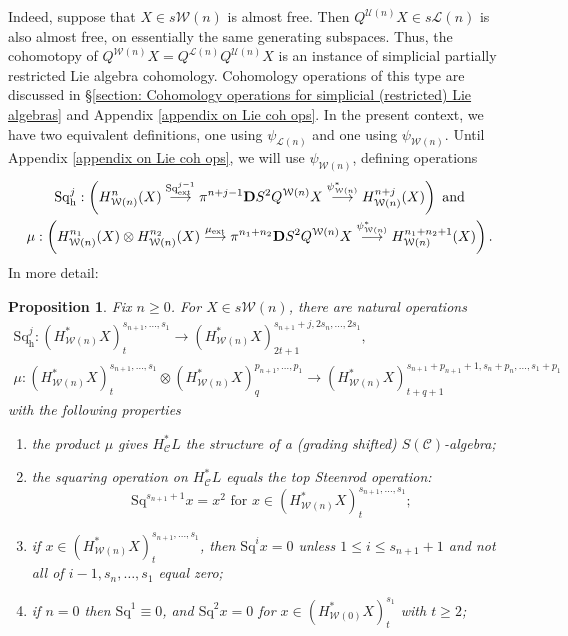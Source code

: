 \documentclass[11pt]{amsart} \renewcommand{\baselinestretch}{1.2}
\theoremstyle{plain}
\newtheorem{prop}[thm]{Proposition}
\numberwithin{equation}{section} %
\theoremstyle{plain}
\newtheorem{prop}[thm]{Proposition}
\numberwithin{equation}{chapter} %
\renewcommand{\to}{\longrightarrow}
\newcommand{\scrC}{\mathscr{C}}
\newcommand{\calU}{\mathcal{U}}
\newcommand{\calL}{\mathcal{L}}
\newcommand{\calw}{\mathcal{W}}
\newcommand{\calc}{\mathcal{C}}
\newcommand{\CommOperad}{{\scrC}}
\newcommand{\ExtCohOp}{\mathrm{Sq}_\mathrm{ext}}
\newcommand{\ExtCohProd}{\mu_\mathrm{ext}}
\newcommand{\Sq}{\mathrm{Sq}}
\newcommand{\dhor}{_\mathrm{h}}
\newcommand{\Sqh}{\mathrm{Sq}\dhor}
\newcommand{\dual}{\mathbf{D}}
\begin{document}
\begin{Cohomology Operations for W and U}
Indeed, suppose that $X\in s\calw(n)$ is almost free. Then $Q^{\calU(n)}X\in s\calL(n)$ is also almost free, on essentially the same generating subspaces. Thus, the cohomotopy of $Q^{\calw(n)}X=Q^{\calL(n)}Q^{\calU(n)}X$ is an instance of simplicial partially restricted Lie algebra cohomology. Cohomology operations of this type are discussed in \S\ref{section: Cohomology operations for simplicial (restricted) Lie algebras} and Appendix \ref{appendix on Lie coh ops}. In the present context, we have two equivalent definitions, one using $\psi_{\calL(n)}$ and one using $\psi_{\calw(n)}$. Until Appendix \ref{appendix on Lie coh ops}, we will use $\psi_{\calw(n)}$, defining operations
\begin{gather*}
\Sqh^j:\left(H_{\calw(n)}^{n}(X)\overset{\ExtCohOp^{j-1}}{\to} \pi^{n+j-1}\dual S^2Q^{\calw(n)}X\overset{\psi_{\calw(n)}^*}{\to} H_{\calw(n)}^{n+j}(X)\right)\textup{ and}\\
\mu:\left(H_{\calw(n)}^{n_1}(X)\otimes H_{\calw(n)}^{n_2}(X)\overset{\ExtCohProd}{\to} \pi^{n_1+n_2}\dual S^2Q^{\calw(n)}X\overset{\psi_{\calw(n)}^*}{\to} H_{\calw(n)}^{n_1+n_2+1}(X)\right).
\end{gather*}
In more detail:
\begin{prop}
\label{Wn Halg omnibus}
Fix $n\geq0$. For $X\in s\calw(n)$, there are natural operations
\begin{gather*}
\Sqh^j:(H^*_{\calw(n)}X)_t^{s_{n+1},\ldots,s_1}\to (H^*_{\calw(n)}X)_{2t+1}^{s_{n+1}+j,2s_{n},\ldots,2s_1},\\
\mu:(H^*_{\calw(n)}X)_t^{s_{n+1},\ldots,s_1}\otimes (H^*_{\calw(n)}X)_q^{p_{n+1},\ldots,p_1}\to (H^*_{\calw(n)}X)_{t+q+1}^{s_{n+1}+p_{n+1}+1,s_{n}+p_{n},\ldots,s_1+p_1}
\end{gather*}
with the following properties
\begin{enumerate}
\item the product $\mu$ gives $H^*_{\calc}L$ the structure of a (grading shifted) $S(\CommOperad)$-algebra;
\item the squaring operation on $H^*_{\calc}L$ equals the \emph{top Steenrod operation}:
\[\Sq^{s_{n+1}+1}x=x^{2}\text{\ \ for $x\in (H^*_{\calw(n)}X)_t^{s_{n+1},\ldots,s_1}$};\]
\item \label{Sq unstable vanishing II} if $x\in (H^*_{\calw(n)}X)_t^{s_{n+1},\ldots,s_1}$, then $\Sq^ix=0$ unless $1\leq i\leq s_{n+1}+1$ and not all of $i-1,s_{n},\ldots,s_1$ equal zero;
\item \label{Sq unstable vanishing III} if $n=0$ then $\Sq^1\equiv 0$, and $\Sq^2x=0$ for $x\in (H^*_{\calw(0)}X)_t^{s_1}$ with $t\geq 2$;

\end{enumerate}
\end{prop}
\end{Cohomology Operations for W and U}
\end{document}
